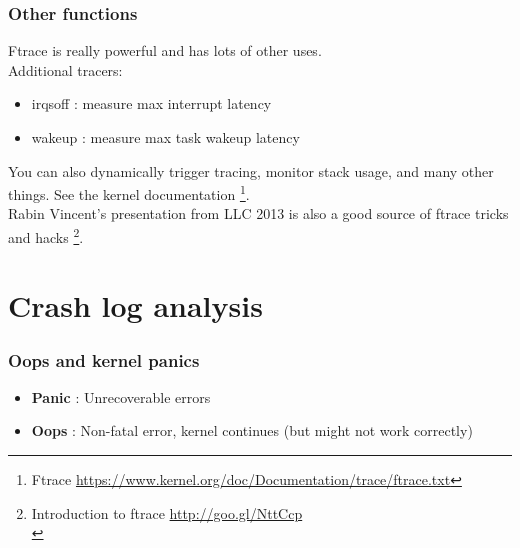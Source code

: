 \documentclass{beamer}
\begin{document}
\begin{frame}
\frametitle{Other functions}
Ftrace is really powerful and has lots of other uses.\\
Additional tracers: \\
\begin{itemize}
	\item irqsoff : measure max interrupt latency
	\item wakeup : measure max task wakeup latency
\end{itemize}
You can also dynamically trigger tracing, monitor stack usage, and many other things. See the kernel documentation \footnote{Ftrace \url{https://www.kernel.org/doc/Documentation/trace/ftrace.txt}}. \\
Rabin Vincent's presentation from LLC 2013 is also a good source of ftrace tricks and hacks \footnote{Introduction to ftrace \url{http://goo.gl/NttCcp} \\}.
\end{frame}
\section{Crash log analysis}
\begin{frame}
\frametitle{Oops and kernel panics}
\begin{itemize}
	\item \textbf{Panic} : Unrecoverable errors
	\item \textbf{Oops} : Non-fatal error, kernel continues (but might not work correctly)
\end{itemize}
\end{frame}
\end{document}
